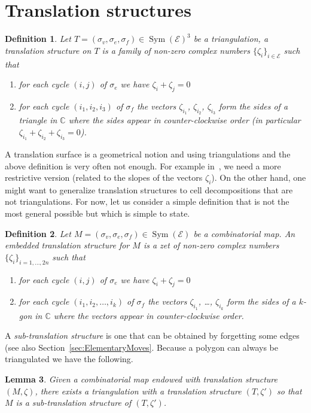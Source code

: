 \documentclass{article}
\def\CC{\mathbb{C}}
\def\cE{\mathcal{E}}
\def\Sym{\operatorname{Sym}}
\newtheorem{definition}{Definition}
\newtheorem{lemma}[definition]{Lemma}
\begin{document}
\section{Translation structures}
\begin{definition}
\label{def:FlatTriangulation}
Let $T = (\sigma_v, \sigma_e, \sigma_f) \in \Sym(\cE)^3$ be a 
triangulation, a \emph{translation structure} on $T$
is a family of non-zero complex numbers $\{\zeta_i\}_{i\in\cE}$
such that
\begin{enumerate}
\item for each cycle $(i,j)$ of $\sigma_e$ we have $\zeta_i + \zeta_j = 0$
\item for each cycle $(i_1,i_2,i_3)$ of $\sigma_f$ 
the vectors $\zeta_{i_1}$, $\zeta_{i_2}$, $\zeta_{i_3}$ form the
sides of a triangle in $\CC$ where the sides appear in counter-clockwise order
(in particular $\zeta_{i_1} + \zeta_{i_2} + \zeta_{i_3} = 0$).
\end{enumerate}
\end{definition}
A translation surface is a geometrical notion and using triangulations
and the above definition is very often not enough.
For example in~\cite{veerer}, we need a more restrictive version
(related to the slopes of the vectors $\zeta_i$).
On the other hand, one might want to generalize translation structures
to cell decompositions that are not triangulations.
For now, let us consider a simple definition that is not the most
general possible but which is simple to state.
\begin{definition}
\label{def:EmbeddedTranslationStructure}
Let $M = (\sigma_v, \sigma_e, \sigma_f) \in \Sym(\cE)$ be a combinatorial
map. An \emph{embedded translation structure} for $M$ is a zet of non-zero
complex numbers $\{\zeta_i\}_{i=1,\ldots,2n}$ such that
\begin{enumerate}
\item for each cycle $(i,j)$ of $\sigma_e$ we have $\zeta_i + \zeta_j = 0$
\item for each cycle $(i_1,i_2,\ldots,i_k)$ of $\sigma_f$ the vectors
$\zeta_{i_1}$, \ldots, $\zeta_{i_k}$ form the sides of a $k$-gon in
$\CC$ where the vectors appear in counter-clockwise order.
\end{enumerate}
\end{definition}

A \emph{sub-translation structure} is one that can be obtained by forgetting
some edges (see also Section~\ref{sec:ElementaryMoves}. Because a polygon can
always be triangulated we have the following.
\begin{lemma}
Given a combinatorial map endowed with translation structure $(M,\zeta)$, there
exists a triangulation with a translation structure $(T,\zeta')$ so that $M$ is
a sub-translation structure of $(T,\zeta')$.
\end{lemma}
\end{document}
